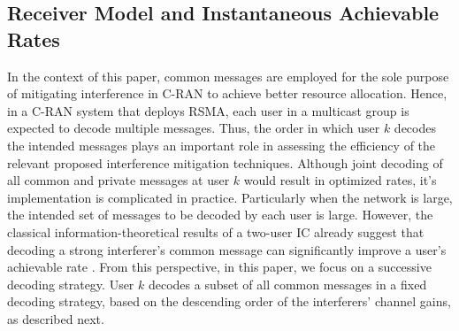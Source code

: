\documentclass[12pt,draftcls,onecolumn]{IEEEtran}
\theoremstyle{remark}
\theoremstyle{definition}
\begin{document}
\subsection{Receiver Model and Instantaneous Achievable Rates}\label{sec:receivermodel}
In the context of this paper, common messages are employed for the sole purpose of mitigating interference in C-RAN to achieve better resource allocation. Hence, in a C-RAN system that deploys RSMA, each user in a multicast group is expected to decode multiple messages. Thus, the order in which user $k$ decodes the intended messages plays an important role in assessing the efficiency of the relevant proposed interference mitigation techniques. Although joint decoding of all common and private messages at user $k$ would result in optimized rates, it's implementation is complicated in practice. Particularly when the network is large, the intended set of messages to be decoded by each user is large. However, the classical information-theoretical results of a two-user IC already suggest that decoding a strong interferer's common message can significantly improve a user's achievable rate \cite{4675741}. From this perspective, in this paper, we focus on a successive decoding strategy. User $k$ decodes a subset of all common messages in a fixed decoding strategy, based on the descending order of the interferers' channel gains, as described next. 
\end{document}
